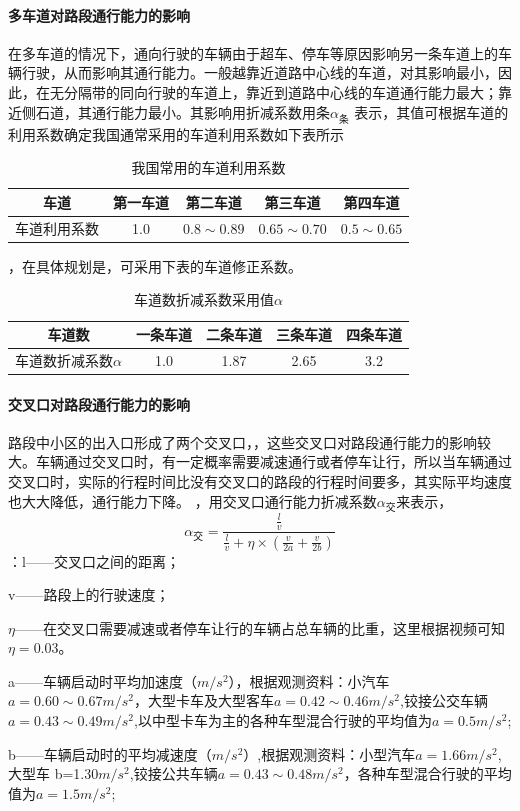 \documentclass[UTF8,12.05pt]{ctexart}
\begin{document}
\paragraph{多车道对路段通行能力的影响}
在多车道的情况下，通向行驶的车辆由于超车、停车等原因影响另一条车道上的车辆行驶，从而影响其通行能力。一般越靠近道路中心线的车道，对其影响最小，因此，在无分隔带的同向行驶的车道上，靠近到道路中心线的车道通行能力最大；靠近侧石道，其通行能力最小。其影响用折减系数用条$\alpha_{\text{条}}$ 表示，其值可根据车道的利用系数确定\cite{chedao}我国通常采用的车道利用系数如下表所示
\begin{table}[H]
  \centering
  \caption{我国常用的车道利用系数}
  \begin{tabular}{|c|c|c|c|c|}
    \hline
    车道 & 第一车道 & 第二车道 & 第三车道 & 第四车道 \\ \hline
    车道利用系数 & 1.0 & $0.8\sim0.89$ & $0.65\sim0.70$ & $0.5\sim0.65$ \\
    \hline
  \end{tabular}
\end{table}
，在具体规划是，可采用下表的车道修正系数。
\begin{table}[H]
  \centering
  \caption{车道数折减系数采用值$\alpha$}
  \begin{tabular}{|c|c|c|c|c|}
    \hline
    车道数 & 一条车道 & 二条车道 & 三条车道 & 四条车道 \\ \hline
    车道数折减系数$\alpha$ & 1.0 & 1.87 & 2.65 & 3.2 \\
    \hline
  \end{tabular}
\end{table}
\paragraph{交叉口对路段通行能力的影响}
路段中小区的出入口形成了两个交叉口，，这些交叉口对路段通行能力的影响较大。车辆通过交叉口时，有一定概率需要减速通行或者停车让行，所以当车辆通过交叉口时，实际的行程时间比没有交叉口的路段的行程时间要多，其实际平均速度也大大降低，通行能力下降。
，用交叉口通行能力折减系数$\alpha_{\text{交}}$来表示，
$$\alpha_{\text{交}}=\frac{\frac{l}{v}}{\frac{l}{v}+\eta\times(\frac{v}{2a}+\frac{v}{2b})}$$
：l——交叉口之间的距离；
\par v——路段上的行驶速度；
\par $\eta$——在交叉口需要减速或者停车让行的车辆占总车辆的比重，这里根据视频可知$\eta=$0.03。
\par a——车辆启动时平均加速度（$m/s^{2}$），根据观测资料：小汽车$a=0.60\sim0.67m/s^{2}$，大型卡车及大型客车$a=0.42\sim0.46m/s^{2}$,铰接公交车辆$a=0.43\sim0.49m/s^{2}$,以中型卡车为主的各种车型混合行驶的平均值为$a=0.5m/s^{2}$;
\par b——车辆启动时的平均减速度（$m/s^{2}$）,根据观测资料：小型汽车$a=1.66m/s^{2}$,大型车
\newline
b=1.30$m/s^{2}$,铰接公共车辆$a=0.43\sim0.48m/s^{2}$，各种车型混合行驶的平均值为$a=1.5m/s^{2}$;
\end{document}
